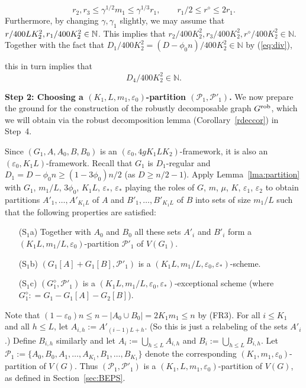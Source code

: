 \documentclass{memo-l}
\def\COMMENT#1{}
\def\cP{\mathcal{P}}
\def\eps{\varepsilon}
\def\epszero{\eps_0}
\numberwithin{section}{chapter}
\numberwithin{equation}{section}
\numberwithin{firstthm}{section}
\numberwithin{figure}{section}
\begin{document}
{\begin{equation}\label{eq:rs}
r_2,r_3\le \gamma^{1/2}m_1\le \gamma^{1/3} r_1,  \qquad  r_1/2\le r^\diamond\le 2r_1.
\end{equation}
Furthermore, by changing $\gamma,\gamma_1$ slightly, we may assume that $r/400LK_2^2, r_1/400K^2_2 \break \in\mathbb{N}$.
This implies that $r_2/400K_2^2, r_3/400K_2^2, r^{\diamond}/400K_2^2 \in \mathbb{N}$.
Together with the fact that $D_1/400K^2_2 = (D - \phi_0 n ) /400K_2^2 \in\mathbb{N}$ by (\ref{eq:div}),%
   \COMMENT{Daniela: added back reference}
this in turn implies that
\begin{equation}\label{divD4}
D_4/400K^2_2\in\mathbb{N}.
\end{equation}

\smallskip


\noindent\textbf{Step 2: Choosing a $(K_1, L, m_1, \epszero)$-partition $(\mathcal{P}_1,\mathcal{P}'_1)$.}
We now prepare the ground for the construction of the robustly decomposable graph $G^{\rm rob}$, 
which we will obtain via the robust decomposition lemma (Corollary~\ref{rdeccor}) in Step~4.

Since $(G_1,A,A_0,B,B_0)$ is an $(\eps_0,  4g K_1 L K_2)$-framework, it is also an $(\eps_0, K_1 L)$-framework.
Recall that $G_1$ is $D_1$-regular and $D_1 = D - \phi_0 n  \ge (1- 3 \phi_0 )n/2$ (as $D \ge n/2 - 1$).
Apply Lemma~\ref{lma:partition} with $G_1$, $m_1/L$, $ 3\phi_0 $, $K_1L$, $\eps_*$, $\eps_*$ playing the roles of
$G$, $m$, $\mu$, $K$, $\eps_1$, $\eps_2$ to obtain partitions $A'_1,\dots,A'_{K_1L}$ of $A$ and $B'_1,\dots,B'_{K_1L}$ of $B$
into sets of size $m_1/L$ such that the following properties are satisfied:
\begin{itemize}
\item[(S$_1$a)] Together with $A_0$ and $B_0$ all
these sets $A'_i$ and $B'_i$ form a $(K_1L,m_1/L,\eps_0)$-partition $\cP'_1$ of $V(G_1)$.
\item[(S$_1$b)] $(G_1[A] +G_1[B], \cP'_1 )$ is a $(K_1L,m_1/L,\eps_0, \eps_*)$-scheme.
\item[(S$_1$c)] $(G^{\diamond}_1, \cP'_1)$ is a $(K_1L,m_1/L,\eps_0, \eps_*)$-exceptional scheme (where $G^{\diamond}_1 : = G_1 - G_1[A] - G_2[B]$).
\end{itemize}
Note that $(1-\eps_0)n\le n-|A_0\cup B_0|=2K_1m_1\le n$ by (FR3).
For all $i\le K_1$ and all $h\le L$, let $A_{i,h}:=A'_{(i-1)L+h}$. (So this is just a relabeling of the sets $A'_i$.)
Define $B_{i,h}$ similarly and let $A_i:= \bigcup_{h\le L} A_{i,h}$ and $B_i:= \bigcup_{h\le L} B_{i,h}$.
Let $\cP_1:=\{A_0,B_0,A_1,\dots,A_{K_1},B_1,\dots,B_{K_1}\}$ denote the
corresponding $(K_1,m_1,\eps_0)$-partition of $V(G)$. Thus $(\cP_1,\cP'_1)$ is a $(K_1,L,m_1,\eps_0)$-partition of $V(G)$,
as defined in Section~\ref{sec:BEPS}.

}
\end{document}
